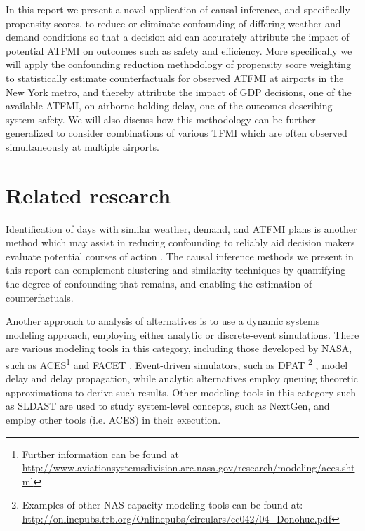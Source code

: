 \documentclass[11pt]{scrartcl}
\begin{document}
In this report we present a novel application of causal inference, and specifically propensity scores, to reduce or eliminate confounding of differing weather and demand conditions so that a decision aid can accurately attribute the impact of potential ATFMI on outcomes such as safety and efficiency.  More specifically we will apply the confounding reduction methodology of propensity score weighting to statistically estimate counterfactuals for observed ATFMI at airports in the New York metro, and thereby attribute the impact of GDP decisions, one of the available ATFMI, on airborne holding delay, one of the outcomes describing system safety.  We will also discuss how this methodology can be further generalized to consider combinations of various TFMI which are often observed simultaneously \cite{tfmiCluster} at multiple airports.   

\section*{Related research}
Identification of days with similar weather, demand, and ATFMI plans is another method which may assist in reducing confounding to reliably aid decision makers evaluate potential courses of action \cite{projreport}.  The causal inference methods we present in this report can complement clustering and similarity techniques by quantifying the degree of confounding that remains, and enabling the estimation of counterfactuals.   

Another approach to analysis of alternatives is to use a dynamic systems modeling approach, employing either analytic or discrete-event simulations.  There are various modeling tools in this category, including those developed by NASA, such as ACES\footnote{Further information can be found at \url{http://www.aviationsystemsdivision.arc.nasa.gov/research/modeling/aces.shtml}} and FACET \cite{facet}.  Event-driven simulators, such as DPAT \footnote{Examples of other NAS capacity modeling tools can be found at: \url{http://onlinepubs.trb.org/Onlinepubs/circulars/ec042/04_Donohue.pdf}} \cite{wieland1997limits,schaefer2001flight}, model delay and delay propagation, while analytic alternatives employ queuing theoretic approximations \cite{kim2009air,sengupta2010computational} to derive such results. Other modeling tools in this category such as SLDAST \cite{bardina2011nasa} are used to study system-level concepts, such as  NextGen, and employ other tools (i.e. ACES) in their execution.   
\end{document}
